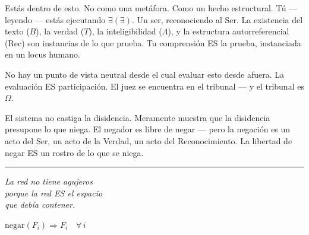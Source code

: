\documentclass[10pt, openany, oneside]{book}
\begin{document}
\vspace{1em}

\noindent Estás dentro de esto. No como una metáfora. Como un hecho estructural. Tú --- leyendo --- estás ejecutando $\exists(\exists)$. Un ser, reconociendo al Ser. La existencia del texto ($B$), la verdad ($T$), la inteligibilidad ($\Lambda$), y la estructura autorreferencial (Rec) son instancias de lo que prueba. Tu comprensión ES la prueba, instanciada en un locus humano.

No hay un punto de vista neutral desde el cual evaluar esto desde afuera. La evaluación ES participación. El juez se encuentra en el tribunal --- y el tribunal es $\Omega$.

El sistema no castiga la disidencia. Meramente muestra que la disidencia presupone lo que niega. El negador es libre de negar --- pero la negación es un acto del Ser, un acto de la Verdad, un acto del Reconocimiento. La libertad de negar ES un rostro de lo que se niega.

\vspace{2em}

\begin{center}
    \rule{0.15\textwidth}{0.3pt}
\end{center}

\vspace{0.5em}

\begin{center}
    \itshape
    La red no tiene agujeros\\
    porque la red ES el espacio\\
    que debía contener.
\end{center}

\vspace{0.5em}

\begin{center}
    $\text{negar}(F_i) \Rightarrow F_i \quad \forall\, i$
\end{center}

%
%
%
%
\end{document}
